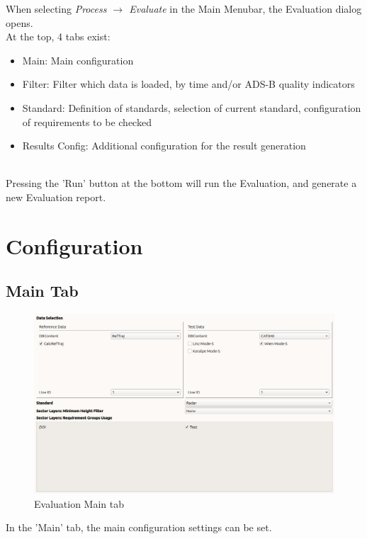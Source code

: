 When selecting \textit{Process $\rightarrow$ Evaluate} in the Main Menubar, the Evaluation dialog opens. \\

At the top, 4 tabs exist:
\begin{itemize}  
\item Main: Main configuration
\item Filter: Filter which data is loaded, by time and/or ADS-B quality indicators
\item Standard: Definition of standards, selection of current standard, configuration of requirements to be checked
\item Results Config: Additional configuration for the result generation
\end{itemize}
\ \\

Pressing the 'Run' button at the bottom will run the Evaluation, and generate a new Evaluation report.

\section{Configuration}
\label{sec:eval_config} 

\subsection{Main Tab}

\begin{figure}[H]
  \hspace*{-2cm}
    \includegraphics[width=18cm]{figures/eval_main.png}
  \caption{Evaluation Main tab}
\end{figure}

In the 'Main' tab, the main configuration settings can be set. \\

